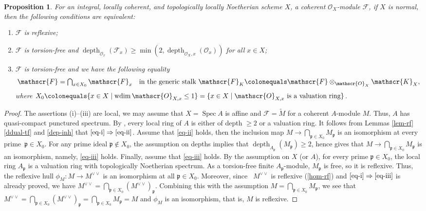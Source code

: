 \documentclass[JEP,XML,SOM,Unicode,published]{cedram}
\newenvironment{enumeratei}
{\bgroup\def\theenumi{\roman{enumi}}\def\theenumii{\arabic{enumii}}\begin{enumerate}}
{\end{enumerate}\egroup}
\let\oldvee\vee
\renewcommand{\vee}{{\scriptscriptstyle\oldvee}}
\let\ts\textstyle
\newcommand{\fp}{\mathfrak{p}}
\newcommand{\sF}{\mathscr{F}}
\newcommand{\sK}{\mathscr{K}}
\newcommand{\sO}{\mathscr{O}}
\let\wt\widetilde
\let\ce\colonequals
\let\x\text
\let\q\quad
\newcommand{\ddual}{\vee\vee}
\DeclareMathOperator{\Spec}{Spec}
\DeclareMathOperator{\wdim}{wdim}
\DeclareMathOperator{\depth}{depth}
\newcommand{\bpf}{\begin{proof}}
\newcommand{\epf}{\end{proof}}
\newcommand{\bprop}{\begin{prop}}
\newcommand{\eprop}{\end{prop}}
\newcommand{\benumr}{\begin{enumeratei}}
\newcommand{\eenumr}{\end{enumeratei}}
\theoremstyle{plain}
\newtheorem{prop}[subsection]{Proposition}
\theoremstyle{definition}
\begin{document}
\bprop\label{rf-s2}
For an integral, locally coherent, and topologically locally Noetherian scheme $X$, a coherent $\sO_X$\nobreakdash-mod\-ule $\sF$, if $X$ is normal, then the following conditions are equivalent:
\benumr
\item\label{eq-i} $\sF$ is reflexive;
\item\label{eq-ii} $\sF$ is torsion-free and $\depth_{\sO_{x}}(\sF_{x})\geq \min(2,\depth_{\sO_X,x}(\sO_{x}))$ {for all $x\in X$};
\item\label{eq-iii} $\sF$ is torsion-free and we have the following equality
\[
\ts \text{$\sF=\bigcap_{x\in X_0}\sF_x$\q in the generic stalk $\sF_K\ce \sF\otimes_{\sO_X}\sK_X$},
\]
where $X_0\ce \{x\in X\mid \wdim\sO_{X,x}\leq 1\}=\{x\in X\mid \x{$\sO_{X,x}$ is a valuation ring}\}$.
\eenumr
\eprop
\bpf
The assertions (i)--(iii) are local, we may assume that $X=\Spec A$ is affine and $\sF=\wt{M}$ for a coherent $A$\nobreakdash-mod\-ule $M$.
Thus, $A$ has quasi-compact punctured spectrum.
By , every local ring of $A$ is either of depth $\geq 2$ or a valuation ring.
It follows from Lemmas \ref{lem-rf}\eqref{ddual-tf} and \ref{dep-inh} that $\eqref{eq-i}\Rightarrow\eqref{eq-ii}$.
Assume that \eqref{eq-ii} holds, then the inclusion map $M\to \bigcap_{\fp\in X_0}M_{\fp}$ is an isomorphism at every prime~$\fp\in X_0$.
For any prime ideal $\fp\not\in X_0$, the assumption on depths implies that $\depth_{A_{\fp}}(M_{\fp})\geq 2$, hence  gives that $M\to \bigcap_{\fp\in X_0}M_{\fp}$ is an isomorphism, namely, \eqref{eq-iii} holds.
Finally, assume that \eqref{eq-iii} holds.
By the assumption on $X$ (or $A$), for every prime $\fp\in X_0$, the local ring $A_{\fp}$ is a valuation ring with topologically Noetherian spectrum.
As a torsion-free finite $A_{\fp}$\nobreakdash-mod\-ule, $M_{\fp}$ is free, so it is reflexive.
Thus, the reflexive hull $\phi_M\colon M\to M^{\ddual}$ is an isomorphism at all $\fp\in X_0$.
Moreover, since~ $M^{\ddual}$ is reflexive (\eqref{hom-rf}) and $\eqref{eq-i}\Rightarrow\eqref{eq-iii}$ is already proved, we have $M^{\ddual}=\bigcap_{\fp\in X_0}(M^{\ddual})_{\fp}$. Combining this with the assumption $M=\bigcap_{\fp\in X_0}M_{\fp}$, we see that $M^{\ddual}=\bigcap_{\fp\in X_0}(M^{\ddual})_{\fp}=\bigcap_{\fp\in X_0}M_{\fp}=M$ and $\phi_M$ is an isomorphism, that is, $M$ is reflexive.
\epf
\end{document}
